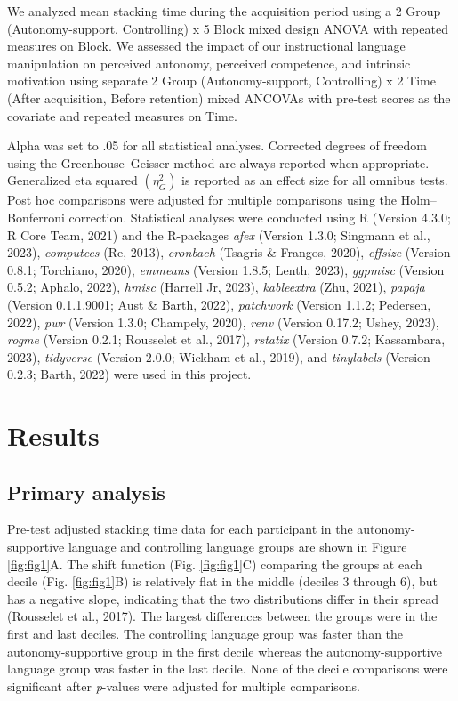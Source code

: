\documentclass[
  man, donotrepeattitle,mask,floatsintext]{apa7}
\begin{document}
We analyzed mean stacking time during the acquisition period using a 2 Group (Autonomy-support, Controlling) x 5 Block mixed design ANOVA with repeated measures on Block. We assessed the impact of our instructional language manipulation on perceived autonomy, perceived competence, and intrinsic motivation using separate 2 Group (Autonomy-support, Controlling) x 2 Time (After acquisition, Before retention) mixed ANCOVAs with pre-test scores as the covariate and repeated measures on Time.

Alpha was set to .05 for all statistical analyses. Corrected degrees of freedom using the Greenhouse--Geisser method are always reported when appropriate. Generalized eta squared \((\eta_{G}^{2})\) is reported as an effect size for all omnibus tests. Post hoc comparisons were adjusted for multiple comparisons using the Holm--Bonferroni correction. Statistical analyses were conducted using R (Version 4.3.0; R Core Team, 2021) and the R-packages \emph{afex} (Version 1.3.0; Singmann et al., 2023), \emph{computees} (Re, 2013), \emph{cronbach} (Tsagris \& Frangos, 2020), \emph{effsize} (Version 0.8.1; Torchiano, 2020), \emph{emmeans} (Version 1.8.5; Lenth, 2023), \emph{ggpmisc} (Version 0.5.2; Aphalo, 2022), \emph{hmisc} (Harrell Jr, 2023), \emph{kableextra} (Zhu, 2021), \emph{papaja} (Version 0.1.1.9001; Aust \& Barth, 2022), \emph{patchwork} (Version 1.1.2; Pedersen, 2022), \emph{pwr} (Version 1.3.0; Champely, 2020), \emph{renv} (Version 0.17.2; Ushey, 2023), \emph{rogme} (Version 0.2.1; Rousselet et al., 2017), \emph{rstatix} (Version 0.7.2; Kassambara, 2023), \emph{tidyverse} (Version 2.0.0; Wickham et al., 2019), and \emph{tinylabels} (Version 0.2.3; Barth, 2022) were used in this project.

\hypertarget{results}{%
\section{Results}\label{results}}

\hypertarget{primary-analysis-1}{%
\subsection{Primary analysis}\label{primary-analysis-1}}

Pre-test adjusted stacking time data for each participant in the autonomy-supportive language and controlling language groups are shown in Figure \ref{fig:fig1}A. The shift function (Fig. \ref{fig:fig1}C) comparing the groups at each decile (Fig. \ref{fig:fig1}B) is relatively flat in the middle (deciles 3 through 6), but has a negative slope, indicating that the two distributions differ in their spread (Rousselet et al., 2017). The largest differences between the groups were in the first and last deciles. The controlling language group was faster than the autonomy-supportive group in the first decile whereas the autonomy-supportive language group was faster in the last decile. None of the decile comparisons were significant after \emph{p}-values were adjusted for multiple comparisons.
\end{document}
